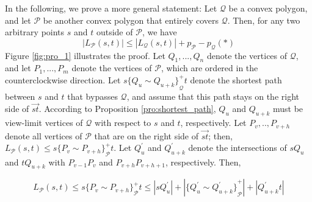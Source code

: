 \begin{myproof} 
\label{proof:scale_factor}
\normalfont
In the following, we prove a more general statement: Let $\mathcal{Q}$ be a convex polygon, and let $\mathcal{P}$ be another convex polygon that entirely covers $\mathcal{Q}$. Then, for any two arbitrary points $s$ and $t$ outside of $\mathcal{P}$, we have
\begin{equation}
\label{statement}
\nonumber 
\left|  L_\mathcal{P}(s,t) \right |  \leq  \left|  L_\mathcal{Q}(s,t) \right |  +  p_\mathcal{P} - p_\mathcal{Q} (*)
\end{equation}
Figure \ref{fig:pro_1} illustrates the proof.
Let $Q_1, ..., Q_n$ denote the vertices of $\mathcal{Q}$, and let $P_1, ..., P_m$ denote the vertices of $\mathcal{P}$, which are ordered in the counterclockwise direction.
Let $s{ \{Q_u \sim Q_{u+k} \}}^{+}_\mathcal{Q} t$ denote the shortest path between $s$ and $t$ that bypasses $\mathcal{Q}$, and assume that this path stays on the right side of $\overrightarrow{st}$.
According to Proposition \ref{pro:shortest_path}, $Q_u$ and $Q_{u+k}$ must be view-limit vertices of $\mathcal{Q}$ with respect to $s$ and $t$, respectively.
Let $P_v, .., P_{v+h}$ denote all vertices of $\mathcal{P}$ that are on the right side of $\overrightarrow{st}$; then, $L_\mathcal{P}(s,t) \leq s{ \{ P_v \sim P_{v+h} \} }^{+}_\mathcal{P}t$. 
Let $Q^{'}_{u}$ and $Q^{'}_{u+k}$ denote the intersections of $sQ_u$ and $tQ_{u+k}$ with $P_{v-1}P_v$ and $P_{v+h}P_{v+h+1}$, respectively. Then,  
\begin{footnotesize}
\begin{equation}
\label{eq:n_4_1}
L_\mathcal{P}(s,t)  \leq s{ \{ P_v \sim P_{v+h} \} }^{+}_\mathcal{P}t 
 \leq \left |sQ^{'}_{u} \right | + \left | { \{ Q^{'}_{u} \sim Q^{'}_{u+k}\} }^{+}_\mathcal{P} \right | + \left |Q^{'}_{u+k}t \right |  
\end{equation}
\end{footnotesize}

\end{myproof}
